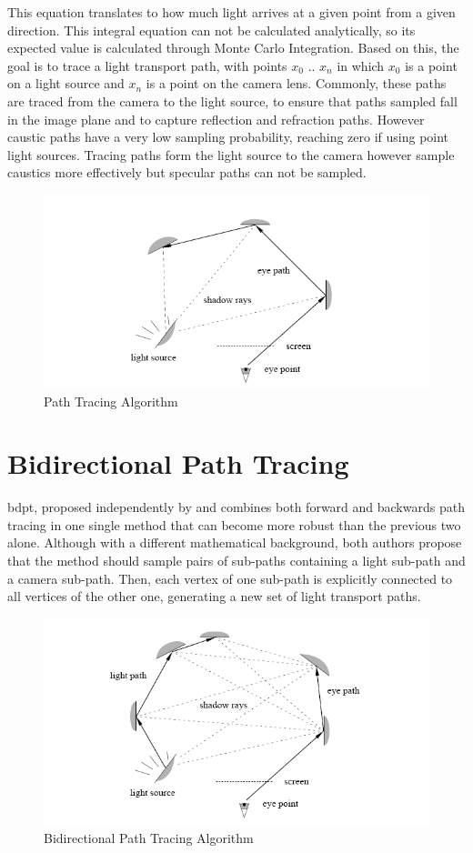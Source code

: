 This equation translates to how much light arrives at a given point from a given direction. This integral equation can not be calculated analytically, so its expected value is calculated through Monte Carlo Integration. Based on this, the goal is to trace a light transport path, with points $x_0$ .. $x_n$ in which $x_0$ is a point on a light source and $x_n$ is a point on the camera lens. 
Commonly, these paths are traced from the camera to the light source, to ensure that paths sampled fall in the image plane and to capture reflection and refraction paths. However caustic paths have a very low sampling probability, reaching zero if using point light sources. Tracing paths form the light source to the camera however sample caustics more effectively but specular paths can not be sampled.

\begin{figure}[H]
\centering
\includegraphics[width=0.75\linewidth]{img/ptDiagram.jpeg}
\caption{\label{img:ptdiag} Path Tracing Algorithm}
\end{figure}

\section{Bidirectional Path Tracing}

\gls{bdpt}, proposed independently by \cite{Veach} and \cite{Lafortune} combines both forward and backwards path tracing in one single method that can become more robust than the previous two alone. Although with a different mathematical background, both authors propose that the method should sample pairs of sub-paths containing a light sub-path and a camera sub-path. Then, each vertex of one sub-path is explicitly connected to all vertices of the other one, generating a new set of light transport paths.

\begin{figure}[H]
\centering
\includegraphics[width=0.75\linewidth]{img/bptDiagram.jpeg}
\caption{\label{img:bptdiag} Bidirectional Path Tracing Algorithm}
\end{figure}

